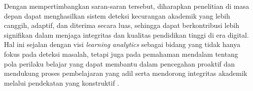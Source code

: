 Dengan mempertimbangkan saran-saran tersebut, diharapkan penelitian di masa depan dapat menghasilkan sistem deteksi kecurangan akademik yang lebih canggih, adaptif, dan diterima secara luas, sehingga dapat berkontribusi lebih signifikan dalam menjaga integritas dan kualitas pendidikan tinggi di era digital. Hal ini sejalan dengan visi \textit{learning analytics} sebagai bidang yang tidak hanya fokus pada deteksi masalah, tetapi juga pada pemahaman mendalam tentang pola perilaku belajar yang dapat membantu dalam pencegahan proaktif \cite{Ferguson2012} dan mendukung proses pembelajaran yang adil serta mendorong integritas akademik melalui pendekatan yang konstruktif \cite{Gasevic2015}.